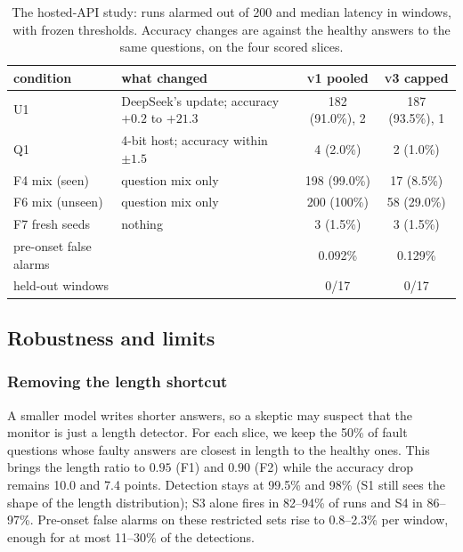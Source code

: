 \documentclass[11pt]{article}
\newcommand{\vone}{\textsc{v1}}
\newcommand{\vthree}{\textsc{v3}}
\begin{document}
\begin{table}[t]
  \centering\small
  \caption{The hosted-API study: runs alarmed out of 200 and median latency in
  windows, with frozen thresholds. Accuracy changes are against the healthy answers
  to the same questions, on the four scored slices.}
  \label{tab:api}
  \setlength{\tabcolsep}{5pt}
  \begin{tabular}{llcc}
    \toprule
    condition & what changed & \vone{} pooled & \vthree{} capped \\
    \midrule
    U1 & DeepSeek's update; accuracy $+0.2$ to $+21.3$ & 182 (91.0\%), 2 & 187 (93.5\%), 1 \\
    Q1 & 4-bit host; accuracy within $\pm1.5$ & 4 (2.0\%) & 2 (1.0\%) \\
    \midrule
    F4 mix (seen) & question mix only & 198 (99.0\%) & 17 (8.5\%) \\
    F6 mix (unseen) & question mix only & 200 (100\%) & 58 (29.0\%) \\
    F7 fresh seeds & nothing & 3 (1.5\%) & 3 (1.5\%) \\
    \midrule
    pre-onset false alarms & & 0.092\% & 0.129\% \\
    held-out windows & & 0/17 & 0/17 \\
    \bottomrule
  \end{tabular}
\end{table}

\subsection{Robustness and limits}
\label{sec:robust}

\subsubsection{Removing the length shortcut}
\label{sec:lengthmatched}
A smaller model writes shorter answers, so a skeptic may suspect that the monitor
is just a length detector. For each slice, we keep the 50\% of fault questions
whose faulty answers are closest in length to the healthy ones. This brings the
length ratio to $0.95$ (F1) and $0.90$ (F2) while the accuracy drop remains
10.0 and 7.4 points. Detection stays at 99.5\% and 98\% (S1 still sees the shape of the length
distribution); S3 alone fires in 82--94\% of runs and S4 in 86--97\%. Pre-onset
false alarms on these restricted sets rise to 0.8--2.3\% per window, enough for
at most 11--30\% of the detections.
\end{document}
